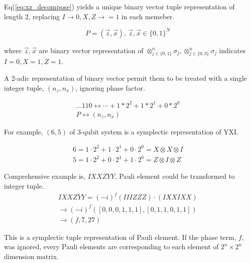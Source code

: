 \documentclass[twocolumn]{article}
\begin{document}
Eq(\ref{eq:xz_decompose}) yields a unique binary vector tuple representation of length 2, replacing
 $I \rightarrow 0, X, Z \rightarrow =1$ in each memeber.

\begin{equation}
    P = (\vec{z}, \vec{x}), \, \vec{z}, \vec{x} \in \{0, 1\}^N
\end{equation}

where $\vec{z}, \vec{x}$ are binary vector representation of $\otimes_{j \in \{0, 1\}}^n \sigma_j, \otimes_{j \in \{0, 3\}}^n \sigma_j$ indicates $I=0, X=1, Z=1$.

A 2-adic representation of binary vector permit them to be treated with 
a single integer tuple, $(n_z, n_x)$, ignoring phase factor.

\begin{align}
    \dots110 \leftrightarrow \cdots + 1*2^2+1*2^1+0*2^0\\
    P \leftrightarrow (n_z, n_x)\label{eq:symplectic_nznx}
\end{align}

For example, $(6, 5)$ of 3-qubit system is a symplectic representation of $\text{YXI}$.

\begin{equation}
    \begin{array}{c}
        6 = 1 \cdot 2^2 +1 \cdot 2^1 + 0 \cdot 2^0 = X \otimes X \otimes I\\
        5 = 1 \cdot 2^2 +0 \cdot 2^1 + 1 \cdot 2^0 = Z \otimes I \otimes Z
    \end{array}
\end{equation}

Comprehensive example is, $IXXZYY$, Pauli element could be transformed to integer tuple.
\begin{align}
    IXXZYY = (-i)^f (IIIZZZ) \cdot (IXXIXX)\\
    \rightarrow (-i)^f ([0,0,0,1,1,1], [0,1,1,0,1,1]) \\
    \rightarrow (f, 7, 27)
\end{align}

This is a symplectic tuple representation of Pauli element.
If the phase term, $f$, was ignored, every Pauli elements are corresponding to 
each element of $2^n \times 2^n$ dimension matrix.
\end{document}
